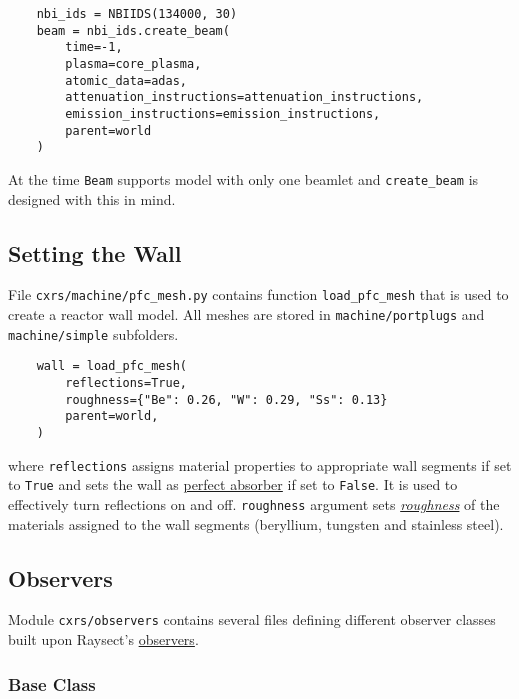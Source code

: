 \documentclass[../main.tex]{subfiles}
\begin{document}
\begin{verbatim}
    nbi_ids = NBIIDS(134000, 30)
    beam = nbi_ids.create_beam(
        time=-1,
        plasma=core_plasma,
        atomic_data=adas,
        attenuation_instructions=attenuation_instructions,
        emission_instructions=emission_instructions,
        parent=world
    )
\end{verbatim}

At the time \texttt{Beam} supports model with only one beamlet and \texttt{create\_beam} is designed with this in mind.

\subsection{Setting the Wall}%
\label{sec:wall}

File \texttt{cxrs/machine/pfc\_mesh.py} contains function \texttt{load\_pfc\_mesh} that is used to create a reactor wall model. All meshes are stored in \texttt{machine/portplugs} and \texttt{machine/simple} subfolders.

\begin{verbatim}
    wall = load_pfc_mesh(
        reflections=True,
        roughness={"Be": 0.26, "W": 0.29, "Ss": 0.13}
        parent=world,
    )
\end{verbatim}
where \texttt{reflections} assigns material properties to appropriate wall segments if set to \texttt{True} and sets the wall as \href{https://raysect.github.io/documentation/api_reference/optical/optical_surfaces.html?highlight=absorber#raysect.optical.material.absorber.AbsorbingSurface}{perfect absorber} if set to \texttt{False}. It is used to effectively turn reflections on and off. \texttt{roughness} argument sets \href{https://raysect.github.io/documentation/demonstrations/materials/surface_roughness.html?highlight=rough}{\emph{roughness}} of the materials assigned to the wall segments (beryllium, tungsten and stainless steel).

\subsection{Observers}%
\label{sec:observers}

Module \texttt{cxrs/observers} contains several files defining different observer classes built upon Raysect's \href{https://raysect.github.io/documentation/api_reference/optical/observers.html?highlight=observer}{observers}.

\subsubsection{Base Class}%
\label{sec:observers_base}
\end{document}

